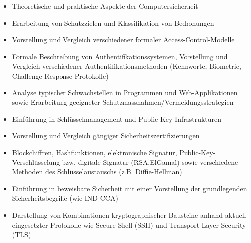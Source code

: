 \begin{course}
\begin{content}
\begin{itemize}\item Theoretische und praktische Aspekte der Computersicherheit  \item Erarbeitung von Schutzzielen und Klassifikation von Bedrohungen  \item Vorstellung und Vergleich verschiedener formaler Access-Control-Modelle  \item Formale Beschreibung von Authentifikationssystemen, Vorstellung und Vergleich verschiedener Authentifikationsmethoden (Kennworte, Biometrie, Challenge-Response-Protokolle)  \item Analyse typischer Schwachstellen in Programmen und Web-Applikationen sowie Erarbeitung geeigneter Schutzmassnahmen/Vermeidungsstrategien  \item Einführung in Schlüsselmanagement und Public-Key-Infrastrukturen  \item Vorstellung und Vergleich gängiger Sicherheitszertifizierungen  \item Blockchiffren, Hashfunktionen, elektronische Signatur, Public-Key-Verschlüsselung bzw. digitale Signatur (RSA,ElGamal) sowie verschiedene Methoden des Schlüsselaustauschs (z.B. Diffie-Hellman)  \item Einführung in beweisbare Sicherheit mit einer Vorstellung der grundlegenden Sicherheitsbegriffe (wie IND-CCA)  \item Darstellung von Kombinationen kryptographischer Bausteine anhand aktuell eingesetzter Protokolle wie Secure Shell (SSH) und Transport Layer Security (TLS)  \end{itemize}
\end{content}







\end{course}
